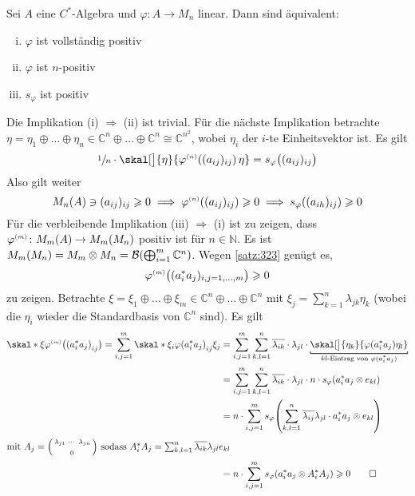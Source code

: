 \begin{satz}[label=satz:325]
	Sei $A$ eine $C^*$-Algebra und $\varphi \colon A \to M_n$ linear.
	Dann sind äquivalent:
	\begin{enumerate}[(i)]
		\item $\varphi$ ist vollständig positiv
		\item $\varphi$ ist $n$-positiv
		\item $s_\varphi$ ist positiv
	\end{enumerate}
\end{satz}
\begin{beweis}
	Die Implikation (i) $\Rightarrow $ (ii) ist trivial. Für die nächste Implikation betrachte $\eta = \eta_1 \oplus \ldots \oplus \eta_n \in \mathbb{C}^n \oplus \ldots \oplus \mathbb{C}^n \cong \mathbb{C}^{n^2}$, wobei $\eta_i$ der $i$-te Einheitsvektor ist.
	Es gilt
	\[
		\sfrac{1}{n} \cdot \skal[\big]{\eta}{\varphi^\ssbrace{n} \enbrace*{(a_{ij})_{ij}} \,\eta} = s_\varphi \enbrace[\big]{(a_{ij})_{ij}}
	\]
	Also gilt weiter
	\[
		M_n(A) \ni (a_{ij})_{ij} \ge 0 \implies \varphi^\ssbrace{n} \enbrace*{(a_{ij})_{ij}} \ge 0 \implies s_\varphi \enbrace*{(a_{ih})_{ij}} \ge 0
	\] 
	Für die verbleibende Implikation (iii) $\Rightarrow $ (i) ist zu zeigen, dass $\varphi^\ssbrace{m} \colon M_m(A) \to M_m(M_n)$ positiv ist für $n \in \mathbb{N}$.
	Es ist $M_m(M_n) = M_m \otimes M_n = \mathcal{B} \enbrace*{\bigoplus_{i=1}^m \mathbb{C}^n}$.
	Wegen \autoref{satz:323} genügt es, 
	\[
		\varphi^\ssbrace{m} \enbrace[\big]{(a_i^* a_j)_{i,j=1, \ldots ,m}} \ge 0 
	\]
	zu zeigen.
	Betrachte $\xi = \xi_1 \oplus \ldots \oplus \xi_m \in \mathbb{C}^n \oplus  \ldots \oplus \mathbb{C}^n$ mit $\xi_j = \sum_{k=1}^n \lambda_{jk} \eta_k$ (wobei die $\eta_i$ wieder die Standardbasis von $\mathbb{C}^n$ sind).
	Es gilt
	\begin{align}
		\skal*{\xi}{\varphi^\ssbrace{m} \enbrace[\big]{ \enbrace*{a_i^* a_j}_{ij}}} = \sum_{i,j=1}^{m} \skal*{\xi_i}{\varphi \enbrace*{a_i^* a_j}_{ij} \xi_j} 
		&= \sum_{i,j=1}^{m} \sum_{k,l=1}^{n} \overline{\lambda_{ik}}\cdot \lambda_{jl} \cdot \Underbracket{\skal[\big]{\eta_k}{\varphi(a_i^* a_j) \eta_l}}{\text{$kl$-Eintrag von $\varphi(a_i^*a_j)$}} \\
		&= \sum_{i,j=1}^{m} \sum_{k,l=1}^{n} \overline{\lambda_{ik}} \cdot \lambda_{jl} \cdot n \cdot s_\varphi \enbrace*{a_i^* a_j \otimes e_{kl}} \\
		&= n \cdot \sum_{i,j=1}^{m} s_\varphi \enbrace*{\sum_{k,l=1}^{n} \overline{\lambda_{ij}} \lambda_{jl} \cdot a_i^* a_j \otimes e_{kl}} \\
		\shortintertext{mit $A_j = \begin{psmallmatrix}
			\lambda_{j1} & \cdots & \lambda_{jn} \\
			& & \\
			 & 0 & 
		\end{psmallmatrix}$ sodass $A_i^*A_j = \sum_{k,l=1}^{n} \overline{\lambda_{ik}} \lambda_{jl} e_{kl}$}
		&= n \cdot \sum_{i,j=1}^{m}  s_\varphi \enbrace*{a_i^*a_j \otimes A_i^* A_j} \ge 0 \qedhere
	\end{align}
\end{beweis}

